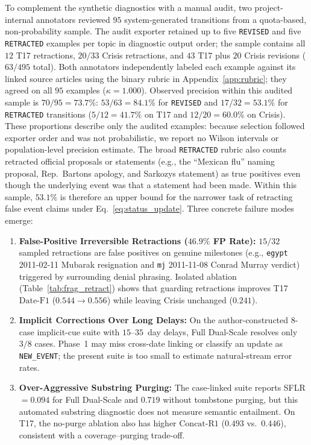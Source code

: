 \documentclass[journal]{IEEEtran}
\begin{document}
To complement the synthetic diagnostics with a manual audit, two project-internal annotators reviewed $95$ system-generated transitions from a quota-based, non-probability sample. The audit exporter retained up to five \texttt{REVISED} and five \texttt{RETRACTED} examples per topic in diagnostic output order; the sample contains all $12$ T17 retractions, $20/33$ Crisis retractions, and $43$ T17 plus $20$ Crisis revisions ($63/495$ total). Both annotators independently labeled each example against its linked source articles using the binary rubric in Appendix~\ref{app:rubric}; they agreed on all $95$ examples ($\kappa = 1.000$). Observed precision within this audited sample is $70/95 = 73.7\%$: $53/63 = 84.1\%$ for \texttt{REVISED} and $17/32 = 53.1\%$ for \texttt{RETRACTED} transitions ($5/12 = 41.7\%$ on T17 and $12/20 = 60.0\%$ on Crisis). These proportions describe only the audited examples: because selection followed exporter order and was not probabilistic, we report no Wilson intervals or population-level precision estimate. The broad \texttt{RETRACTED} rubric also counts retracted official proposals or statements (e.g., the ``Mexican flu'' naming proposal, Rep.\ Barton\textquotesingle s apology, and Sarkozy\textquotesingle s statement) as true positives even though the underlying event was that a statement had been made. Within this sample, $53.1\%$ is therefore an upper bound for the narrower task of retracting false event claims under Eq.~\eqref{eq:status_update}. Three concrete failure modes emerge:
\begin{enumerate}
    \item \textbf{False-Positive Irreversible Retractions ($46.9\%$ FP Rate):} $15/32$ sampled retractions are false positives on genuine milestones (e.g., \texttt{egypt} 2011-02-11 Mubarak resignation and \texttt{mj} 2011-11-08 Conrad Murray verdict) triggered by surrounding denial phrasing. Isolated ablation (Table~\ref{tab:frag_retract}) shows that guarding retractions improves T17 $\text{Date-F1}$ ($0.544 \to 0.556$) while leaving Crisis unchanged ($0.241$).
    \item \textbf{Implicit Corrections Over Long Delays:} On the author-constructed $8$-case implicit-cue suite with $15\text{--}35$~day delays, Full Dual-Scale resolves only $3/8$ cases. Phase~1 may miss cross-date linking or classify an update as \texttt{NEW\_EVENT}; the present suite is too small to estimate natural-stream error rates.
    \item \textbf{Over-Aggressive Substring Purging:} The case-linked suite reports SFLR $=0.094$ for Full Dual-Scale and $0.719$ without tombstone purging, but this automated substring diagnostic does not measure semantic entailment. On T17, the no-purge ablation also has higher $\text{Concat-R1}$ ($0.493$ vs.\ $0.446$), consistent with a coverage--purging trade-off.
\end{enumerate}
\end{document}
